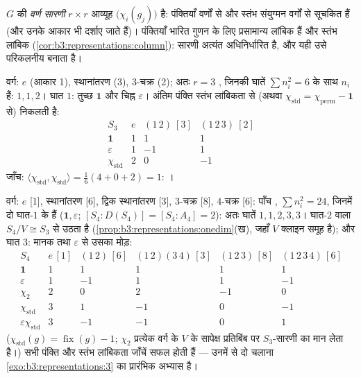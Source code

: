 \begin{definition}\label{def:b3:representations:table}
$G$ की \emph{वर्ण सारणी} $r \times r$ आव्यूह $\bigl(\chi_i(g_j)\bigr)$
है: पंक्तियाँ  वर्णों से और स्तंभ संयुग्मन वर्गों से
सूचकित हैं (और उनके आकार भी दर्शाए जाते हैं)। पंक्तियाँ भारित
गुणन के लिए प्रसामान्य लांबिक हैं और स्तंभ लांबिक (\cref{cor:b3:representations:column}):
सारणी अत्यंत अधिनिर्धारित है, और यही उसे परिकलनीय बनाता है।
\end{definition}

\begin{example}[$S_3$ की सारणी]\label{ex:b3:representations:s3}
वर्ग: $e$ (आकार 1), स्थानांतरण (3), $3$-चक्र (2); अतः $r
= 3$
, जिनकी घातें $\sum n_i^2 = 6$ के साथ $n_i$ हैं: $1, 1,
2$। घात $1$:
तुच्छ $\mathbf 1$ और चिह्न $\varepsilon$। अंतिम पंक्ति स्तंभ लांबिकता से (अथवा
$\chi_{\mathrm{std}} = \chi_{\mathrm{perm}} - \mathbf 1$ से) निकलती है:
\[
\begin{array}{c|ccc}
S_3 & e & (1\,2)\ [3] & (1\,2\,3)\ [2]\\
\hline
\mathbf 1 & 1 & 1 & 1\\
\varepsilon & 1 & -1 & 1\\
\chi_{\mathrm{std}} & 2 & 0 & -1
\end{array}
\]
जाँच: $\langle\chi_{\mathrm{std}},\chi_{\mathrm{std}}\rangle =
\frac{1}{6}(4 + 0 + 2) = 1$: ।
\end{example}

\begin{example}[$S_4$ की सारणी]\label{ex:b3:representations:s4}
वर्ग: $e$ [1], स्थानांतरण [6], द्विक स्थानांतरण [3], $3$-चक्र
[8], $4$-चक्र [6]: पाँच , $\sum n_i^2 =
24$, जिनमें दो घात-$1$ के
हैं ($\mathbf 1, \varepsilon$; $[S_4 :
D(S_4)] = [S_4 : A_4] = 2$): अतः घातें $1, 1, 2, 3, 3$। घात-$2$ वाला $S_4/V \cong S_3$ से उठता
है (\cref{prop:b3:representations:onedim}(ख), जहाँ $V$ क्लाइन समूह है); और घात $3$: मानक
 तथा $\varepsilon$ से उसका मोड़:
\[
\begin{array}{c|ccccc}
S_4 & e\,[1] & (1\,2)\,[6] & (1\,2)(3\,4)\,[3] &
(1\,2\,3)\,[8] & (1\,2\,3\,4)\,[6]\\
\hline
\mathbf 1 & 1 & 1 & 1 & 1 & 1\\
\varepsilon & 1 & -1 & 1 & 1 & -1\\
\chi_2 & 2 & 0 & 2 & -1 & 0\\
\chi_{\mathrm{std}} & 3 & 1 & -1 & 0 & -1\\
\varepsilon\chi_{\mathrm{std}} & 3 & -1 & -1 & 0 & 1
\end{array}
\]
($\chi_{\mathrm{std}}(g) = \operatorname{fix}(g) - 1$; $\chi_2$ प्रत्येक वर्ग के $V$ के सापेक्ष प्रतिबिंब पर
$S_3$-सारणी का मान लेता है।) सभी पंक्ति और स्तंभ लांबिकता जाँचें
सफल होती हैं --- उनमें से दो चलाना \cref{exo:b3:representations:3} का प्रारंभिक अभ्यास है।
\end{example}

